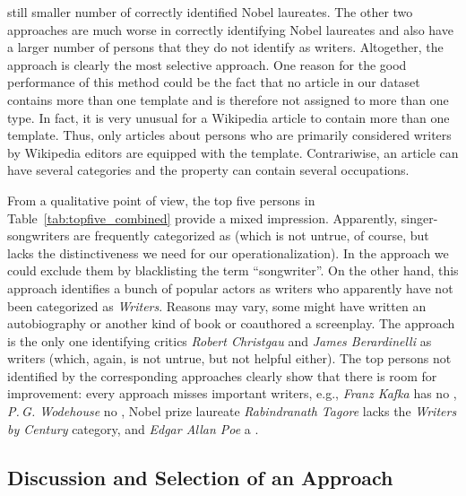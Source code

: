 \documentclass[a4paper,12pt]{scrartcl}
\begin{document}
still smaller number of correctly identified Nobel laureates.
%
The other two approaches are much worse in correctly identifying
Nobel laureates and also have a larger number of persons that they do
not identify as writers.
%
Altogether, the \apInfoboxesEn approach is clearly the most selective
approach. 
%
One reason for the good performance of this method could be the fact 
that no  article in our dataset contains more than
one template and is therefore not assigned to more than one type.
In fact, it is very unusual for a Wikipedia article to contain more
than one template. Thus, only articles about persons who are primarily
considered writers by Wikipedia editors are equipped with the
 template. Contrariwise, an article can have several
categories and the  property can contain several
occupations.


From a qualitative point of view, the top five persons in
Table~\ref{tab:topfive_combined} provide a mixed
impression. Apparently, singer-songwriters are frequently categorized
as  (which is not untrue, of course, but lacks
the distinctiveness we need for our operationalization).
%
In the \apInfProps approach we could exclude them by blacklisting the
term ``songwriter''. On the other hand, this approach identifies
a bunch of popular actors as writers who apparently have not been categorized
as \emph{Writers}.
Reasons may vary, some might have written an autobiography or another
kind of book or coauthored a screenplay.
%
The \apInfoboxesEn approach is the only one identifying critics
\emph{Robert Christgau} and \emph{James Berardinelli} as
writers (which, again, is not untrue, but not helpful either).
%
The top persons not identified by the corresponding approaches
clearly show that there is room for improvement: every approach
misses important writers, e.g., \emph{Franz Kafka} has no
\apInfoboxesEn, \emph{P.\,G. Wodehouse} no \apCategoryGraph,
Nobel prize laureate \emph{Rabindranath Tagore} lacks the
\emph{Writers by Century} category, and \emph{Edgar Allan Poe} a \apInfProps.



\subsection{Discussion and Selection of an Approach}\label{sec:disc-select-an}
\end{document}
